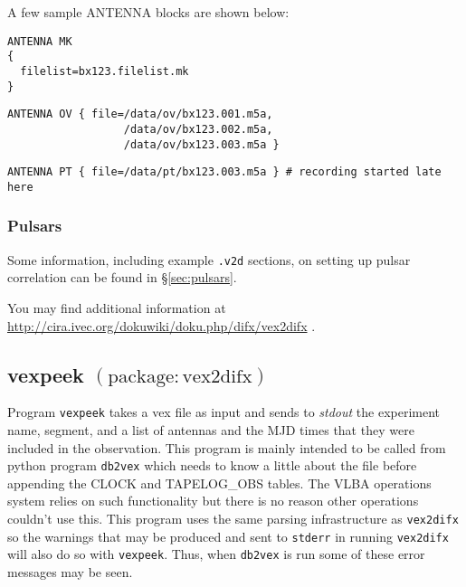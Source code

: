 A few sample ANTENNA blocks are shown below:

\begin{verbatim}
ANTENNA MK 
{
  filelist=bx123.filelist.mk
}
\end{verbatim}

\begin{verbatim}
ANTENNA OV { file=/data/ov/bx123.001.m5a, 
                  /data/ov/bx123.002.m5a,
                  /data/ov/bx123.003.m5a }
\end{verbatim}

\begin{verbatim}
ANTENNA PT { file=/data/pt/bx123.003.m5a } # recording started late here
\end{verbatim}


\subsubsection{Pulsars}

Some information, including example {\tt .v2d} sections, on setting up pulsar correlation can be found in \S\ref{sec:pulsars}.


You may find additional information at \url{http://cira.ivec.org/dokuwiki/doku.php/difx/vex2difx} .







\subsection{vexpeek {\small $\mathrm{(package: vex2difx)}$}} \label{sec:vexpeek}

Program {\tt vexpeek} takes a vex file as input and sends to {\em stdout} the experiment name, segment, and a list of antennas and the MJD times that they were included in the observation.
This program is mainly intended to be called from python program {\tt db2vex} which needs to know a little about the file before appending the CLOCK and TAPELOG\_OBS tables.  
The VLBA operations system relies on such functionality but there is no reason other operations couldn't use this.
This program uses the same parsing infrastructure as {\tt vex2difx} so the warnings that may be produced and sent to {\tt stderr} in running {\tt vex2difx} will also do so with {\tt vexpeek}.
Thus, when {\tt db2vex} is run some of these error messages may be seen.

